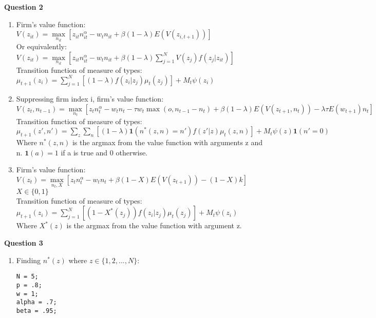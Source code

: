 \documentclass[12pt]{article}
\begin{document}
\begin{onehalfspace}
\textbf{Question 2}
\begin{enumerate}[1.]
    \item 
    Firm's value function:\\
    $V(z_{it}) = \max\limits_{n_{it}}\left[z_{it}n_{it}^\alpha -w_tn_{it} + \beta(1-\lambda) E(V(z_{i,t+1}))\right]$\\
    Or equivalently:\\
    $V(z_{it}) = \max\limits_{n_{it}}\left[z_{it}n_{it}^\alpha -w_tn_{it} + \beta(1-\lambda) \sum\limits_{j=1}^{N}V(z_j)f(z_j|z_{it})\right]$\\
    Transition function of measure of types:\\
    $\mu_{t+1}(z_i) = \sum\limits_{j=1}^{N}\left[(1-\lambda)f(z_i|z_j)\mu_t(z_j)\right] + M_t\psi(z_i)$
    \item
    Suppressing firm index i, firm's value function:\\
    $V(z_t, n_{t-1}) = \max\limits_{n_t}\left[z_tn_t^\alpha -w_tn_t -\tau w_t \max(o, n_{t-1}-n_t) + \beta(1-\lambda) E(V(z_{t+1},n_t)) -\lambda \tau E(w_{t+1}) n_t\right]$\\
    Transition function of measure of types:\\
    $\mu_{t+1}(z', n') = \sum\limits_{z}\sum\limits_{n}\left[(1-\lambda)\textbf{1}(n^*(z, n) = n')f(z'|z)\mu_t(z,n)\right] + M_t\psi(z)\textbf{1}(n'=0)$\\
    Where $n^*(z,n)$ is the argmax from the value function with arguments z and n. $\textbf{1}(a) = 1$ if a is true and $0$ otherwise. 
    \item
    Firm's value function:\\
    $V(z_t) = \max\limits_{n_t, X}\left[z_t n_t^\alpha -w_t n_t + \beta(1-X) E(V(z_{t+1})) - (1-X)k\right]$\\
    $X \in \{0,1\}$\\
    Transition function of measure of types:\\
    $\mu_{t+1}(z_i) = \sum\limits_{j=1}^{N}\left[(1-X^*(z_j))f(z_i|z_j)\mu_t(z_j)\right] + M_t\psi(z_i)$\\
    Where $X^*(z)$ is the argmax from the value function with argument z.
\end{enumerate}

\textbf{Question 3}
\begin{enumerate}[1.]
    \item 
    Finding $n^*(z)$ where $z \in \{1,2,...,N\}$:
    \begin{lstlisting}
N = 5;
p = .8;
w = 1;
alpha = .7;
beta = .95;


\end{lstlisting}
\end{enumerate}
\end{onehalfspace}
\end{document}

